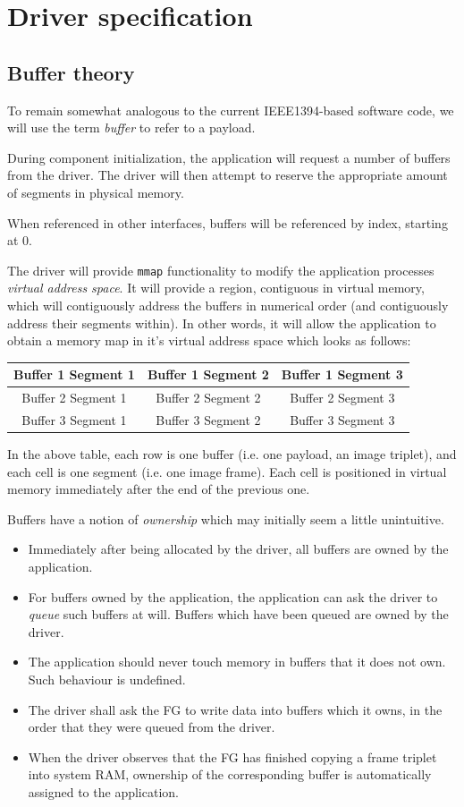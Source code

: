 \documentclass[12pt]{article}
\begin{document}
\section{Driver specification}

\subsection{Buffer theory}

To remain somewhat analogous to the current IEEE1394-based software code, we will use the term \textit{buffer} to refer to a payload.

During component initialization, the application will request a number of buffers from the driver. The driver will then attempt to reserve the appropriate amount of segments in physical memory.

When referenced in other interfaces, buffers will be referenced by index, starting at 0.

The driver will provide \texttt{mmap} functionality to modify the application processes \textit{virtual address space}. It will provide a region, contiguous in virtual memory, which will contiguously address the buffers in numerical order (and contiguously address their segments within). In other words, it will allow the application to obtain a memory map in it's virtual address space which looks as follows:

\begin{tabular}{|c|c|c|}\hline
Buffer 1 Segment 1 & Buffer 1 Segment 2 & Buffer 1 Segment 3 \\ \hline
Buffer 2 Segment 1 & Buffer 2 Segment 2 & Buffer 2 Segment 3 \\ \hline
Buffer 3 Segment 1 & Buffer 3 Segment 2 & Buffer 3 Segment 3 \\ \hline
\end{tabular}

In the above table, each row is one buffer (i.e. one payload, an image triplet), and each cell is one segment (i.e. one image frame). Each cell is positioned in virtual memory immediately after the end of the previous one.

Buffers have a notion of \textit{ownership} which may initially seem a little unintuitive.
\begin{itemize}
\item Immediately after being allocated by the driver, all buffers are owned by the application.
\item For buffers owned by the application, the application can ask the driver to \textit{queue} such buffers at will. Buffers which have been queued are owned by the driver.
\item The application should never touch memory in buffers that it does not own. Such behaviour is undefined.
\item The driver shall ask the FG to write data into buffers which it owns, in the order that they were queued from the driver.
\item When the driver observes that the FG has finished copying a frame triplet into system RAM, ownership of the corresponding buffer is automatically assigned to the application.
\end{itemize}
\end{document}
